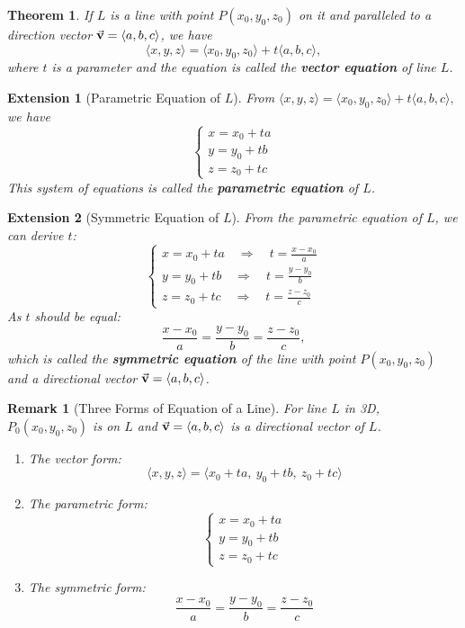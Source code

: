 \documentclass[12pt,a4paper]{article}
\newtheorem{thm}{Theorem}[subsection]
\newtheorem*{rmk}{\indent Remark}
\newtheorem*{ext}{\indent Extension}
\def\vecv{\va{v}}
\begin{document}
\begin{thm}
	If $L$ is a line with point $P(x_0,y_0,z_0)$ on it and paralleled to a direction vector $\vecv=\langle a,b,c\rangle$, we have \[\langle x,y,z\rangle=\langle x_0,y_0,z_0\rangle+t\langle a,b,c\rangle,\] where $t$ is a parameter and the equation is called the \textbf{vector equation} of line $L$.	
\end{thm}
\begin{ext}[Parametric Equation of $L$]
	From $\langle x,y,z\rangle=\langle x_0,y_0,z_0\rangle+t\langle a,b,c\rangle,$ we have \[\begin{cases}x=x_0+ta\\y=y_0+tb\\z=z_0+tc\end{cases}\] This system of equations is called the \textbf{parametric equation} of $L$.
\end{ext}
\begin{ext}[Symmetric Equation of $L$]
	From the parametric equation of $L$, we can derive $t$: 
	\[\begin{cases}x=x_0+ta\quad\Longrightarrow\quad t=\frac{x-x_0}{a}\\y=y_0+tb\quad\Longrightarrow\quad t=\frac{y-y_0}{b}\\z=z_0+tc\quad\Longrightarrow\quad t=\frac{z-z_0}{c}\end{cases}\] As $t$ should be equal: \[\frac{x-x_0}{a}=\frac{y-y_0}{b}=\frac{z-z_0}{c},\] which is called the \textbf{symmetric equation} of the line with point $P(x_0,y_0,z_0)$ and a directional vector $\vecv=\langle a,b,c\rangle$.
\end{ext}
\begin{rmk}[Three Forms of Equation of a Line]
	For line $L$ in 3D, $P_0(x_0,y_0,z_0)$ is on $L$ and $\vecv=\langle a,b,c\rangle$ is a directional vector of $L$.
	\begin{enumerate}
		\item The vector form: \[\langle x,y,z\rangle=\langle x_0+ta,\ y_0+tb,\ z_0+tc\rangle\]
		\item The parametric form: \[\begin{cases}x=x_0+ta\\y=y_0+tb\\z=z_0+tc\end{cases}\]
		\item The symmetric form: \[\frac{x-x_0}{a}=\frac{y-y_0}{b}=\frac{z-z_0}{c}\]	
	\end{enumerate}
\end{rmk}
\end{document}
